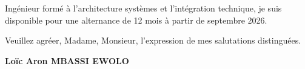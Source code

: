 \documentclass[a4paper,11pt]{article}
\begin{document}
\vspace{0.8em}

Ing\'enieur form\'e \`a l'architecture syst\`emes et l'int\'egration technique, je suis disponible pour une alternance de 12 mois \`a partir de septembre 2026.

\vspace{1.5em}
\noindent Veuillez agr\'eer, Madame, Monsieur, l'expression de mes salutations distingu\'ees.

\vspace{2em}
\noindent \textbf{Lo\"ic Aron MBASSI EWOLO}
\end{document}
